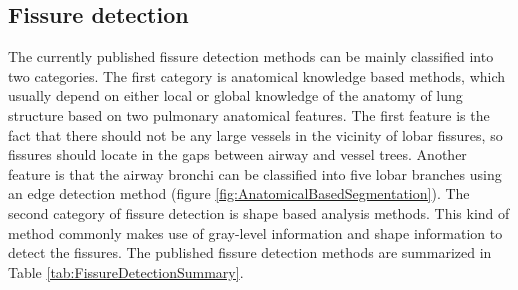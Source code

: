 \subsection{Fissure detection}
The currently published fissure detection methods can be mainly classified into two categories. The first category is anatomical knowledge based methods, which usually depend on either local or global knowledge of the anatomy of lung structure based on two pulmonary anatomical features. The first feature is the fact that there should not be any large vessels in the vicinity of lobar fissures, so fissures should locate in the gaps between airway and vessel trees. Another feature is that the airway bronchi can be classified into five lobar branches using an edge detection method (figure \ref{fig:AnatomicalBasedSegmentation}). The second category of fissure detection is shape based analysis methods. This kind of method commonly makes use of gray-level information and shape information to detect the fissures. The published fissure detection methods are summarized in Table \ref{tab:FissureDetectionSummary}.

